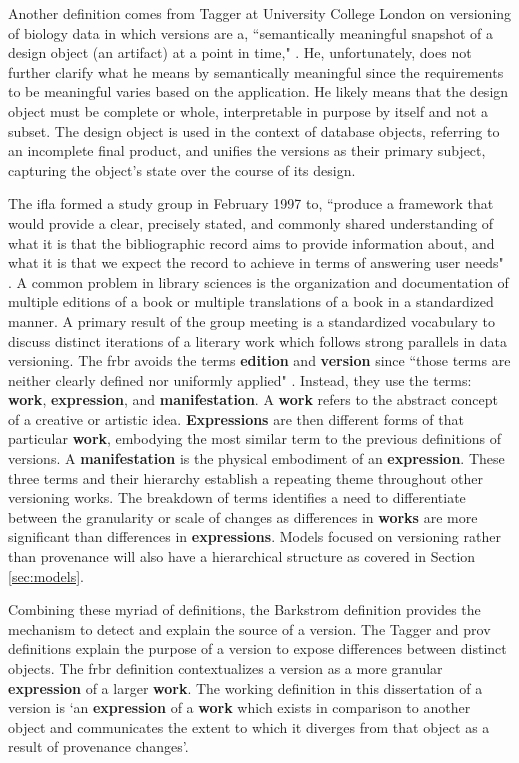 Another definition comes from Tagger at University College London on versioning of biology data in which versions are a, ``semantically meaningful snapshot of a design object (an artifact) at a point in time," \cite{Tagger2005}.
He, unfortunately, does not further clarify what he means by semantically meaningful since the requirements to be meaningful varies based on the application.
He likely means that the design object must be complete or whole, interpretable in purpose by itself and not a subset.
The design object is used in the context of database objects, referring to an incomplete final product, and unifies the versions as their primary subject, capturing the object's state over the course of its design.

The \gls{ifla} formed a study group in February 1997 to, ``produce a framework that would provide a clear, precisely stated, and commonly shared understanding of what it is that the bibliographic record aims to provide information about, and what it is that we expect the record to achieve in
terms of answering user needs" \cite{frbr}.
A common problem in library sciences is the organization and documentation of multiple editions of a book or multiple translations of a book in a standardized manner.
A primary result of the group meeting is a standardized vocabulary to discuss distinct iterations of a literary work which follows strong parallels in data versioning.
The \gls{frbr} avoids the terms \textbf{edition} and \textbf{version} since ``those terms are neither clearly defined nor uniformly applied" \cite{frbr}.
Instead, they use the terms: \textbf{work}, \textbf{expression}, and \textbf{manifestation}.
A \textbf{work} refers to the abstract concept of a creative or artistic idea.
\textbf{Expressions} are then different forms of that particular \textbf{work}, embodying the most similar term to the previous definitions of versions.
A \textbf{manifestation} is the physical embodiment of an \textbf{expression}.
These three terms and their hierarchy establish a repeating theme throughout other versioning works.
The breakdown of terms identifies a need to differentiate between the granularity or scale of changes as differences in \textbf{works} are more significant than differences in \textbf{expressions}.
Models focused on versioning rather than provenance will also have a hierarchical structure as covered in Section \ref{sec:models}.

Combining these myriad of definitions, the Barkstrom definition provides the mechanism to detect and explain the source of a version.
The Tagger and \gls{prov} definitions explain the purpose of a version to expose differences between distinct objects.
The \gls{frbr} definition contextualizes a version as a more granular \textbf{expression} of a larger \textbf{work}.
The working definition in this dissertation of a \gls{version} is `an \textbf{expression} of a \textbf{work} which exists in comparison to another object and communicates the extent to which it diverges from that object as a result of provenance changes'.

